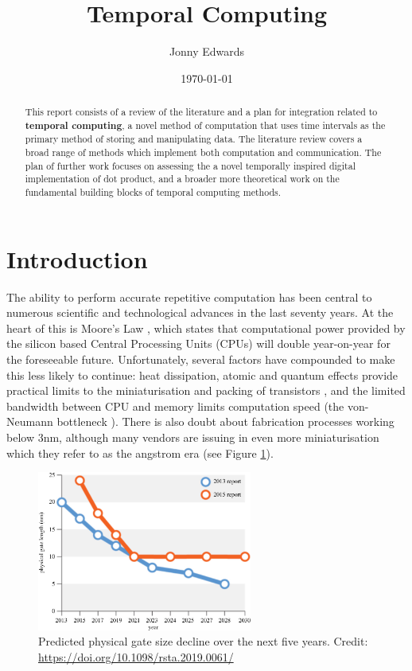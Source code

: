 \documentclass{article}
\title{Temporal Computing}
\author{Jonny Edwards}
\date{\today}
\begin{document}
\maketitle
\begin{abstract}
	This report consists of a review of the literature and a plan for integration related to \textbf{temporal computing}, a novel method of computation that uses time intervals as the primary method of storing and manipulating data. The literature review covers a broad range of methods which implement both computation and communication. The plan of further work focuses on assessing the a novel temporally inspired digital implementation of dot product, and a broader more theoretical work on the fundamental building blocks of temporal computing methods.
\end{abstract}

\section{Introduction}
The ability to perform accurate repetitive computation has been central to numerous scientific and technological advances in the last seventy years. At the heart of this is Moore's Law \cite{Moore:2000:CMC:333067.333074}, which states that computational power provided by the silicon based Central Processing Units (CPUs) will double year-on-year for the foreseeable future. Unfortunately, several factors have compounded to make this less likely to continue: heat dissipation, atomic and quantum effects provide practical limits to the miniaturisation and packing of transistors \cite{moorefail}, and the limited bandwidth between CPU and memory limits computation speed (the von-Neumann bottleneck \cite{Backus:1978:PLV:359576.359579}). There is also doubt about  fabrication processes working below 3nm, although many vendors are issuing in even more miniaturisation which they refer to as the angstrom era (see Figure \ref{fig:intel}).


\begin{figure}[ht]
	\centering
	\includegraphics[width=200pt]{figures/intel2.jpg}
	\caption{Predicted physical gate size decline over the next five years. Credit: \url{https://doi.org/10.1098/rsta.2019.0061/}}
	\label{fig:intel}
\end{figure}
\end{document}
